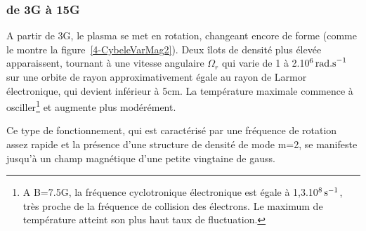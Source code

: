 \begin{refsection}
\subsubsection{de 3G à 15G}
A partir de 3G, le plasma se met en rotation, changeant encore de forme (comme
le montre la figure~\ref{4-CybeleVarMag2}). Deux îlots de densité plus élevée
apparaissent, tournant à une vitesse angulaire $\Omega_r$ qui varie de 1 à 
2.10$^{{6}}\,\text{rad.s}^{{-1}}$ sur une orbite de rayon
 approximativement égale au rayon de Larmor électronique, qui devient inférieur
à 5cm. La température maximale commence à osciller\footnote{A B=7.5G, la
fréquence cyclotronique électronique est égale à
1,3.10$^{{8}}\,\text{s}^{{-1}}$, très proche de la fréquence de
collision des électrons. Le maximum de température atteint son plus haut taux de fluctuation.} et augmente plus modérément.

Ce type de fonctionnement, qui est caractérisé par une
fréquence de rotation assez rapide et la présence d'une structure de densité de
mode m=2, se manifeste jusqu'à un champ magnétique d'une petite vingtaine de
gauss. 


\end{refsection}
